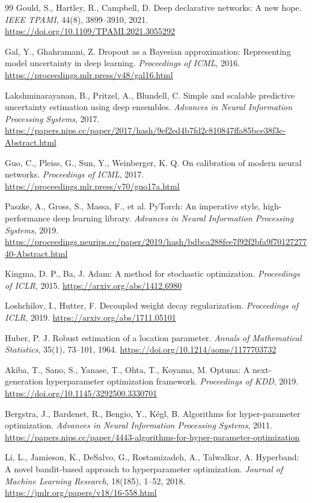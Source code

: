 \documentclass[11pt]{article}
\theoremstyle{definition}
\begin{document}
\begin{thebibliography}{99}
 Gould, S., Hartley, R., Campbell, D. Deep declarative networks: A new hope. \textit{IEEE TPAMI}, 44(8), 3899--3910, 2021. \url{https://doi.org/10.1109/TPAMI.2021.3055292}

 Gal, Y., Ghahramani, Z. Dropout as a Bayesian approximation: Representing model uncertainty in deep learning. \textit{Proceedings of ICML}, 2016. \url{https://proceedings.mlr.press/v48/gal16.html}

 Lakshminarayanan, B., Pritzel, A., Blundell, C. Simple and scalable predictive uncertainty estimation using deep ensembles. \textit{Advances in Neural Information Processing Systems}, 2017. \url{https://papers.nips.cc/paper/2017/hash/9ef2ed4b7fd2c810847ffa85bce38f3c-Abstract.html}

 Guo, C., Pleiss, G., Sun, Y., Weinberger, K. Q. On calibration of modern neural networks. \textit{Proceedings of ICML}, 2017. \url{https://proceedings.mlr.press/v70/guo17a.html}

 Paszke, A., Gross, S., Massa, F., et al. PyTorch: An imperative style, high-performance deep learning library. \textit{Advances in Neural Information Processing Systems}, 2019. \url{https://proceedings.neurips.cc/paper/2019/hash/bdbca288fee7f92f2bfa9f7012727740-Abstract.html}

 Kingma, D. P., Ba, J. Adam: A method for stochastic optimization. \textit{Proceedings of ICLR}, 2015. \url{https://arxiv.org/abs/1412.6980}

 Loshchilov, I., Hutter, F. Decoupled weight decay regularization. \textit{Proceedings of ICLR}, 2019. \url{https://arxiv.org/abs/1711.05101}

 Huber, P. J. Robust estimation of a location parameter. \textit{Annals of Mathematical Statistics}, 35(1), 73--101, 1964. \url{https://doi.org/10.1214/aoms/1177703732}

 Akiba, T., Sano, S., Yanase, T., Ohta, T., Koyama, M. Optuna: A next-generation hyperparameter optimization framework. \textit{Proceedings of KDD}, 2019. \url{https://doi.org/10.1145/3292500.3330701}

 Bergstra, J., Bardenet, R., Bengio, Y., Kégl, B. Algorithms for hyper-parameter optimization. \textit{Advances in Neural Information Processing Systems}, 2011. \url{https://papers.nips.cc/paper/4443-algorithms-for-hyper-parameter-optimization}

 Li, L., Jamieson, K., DeSalvo, G., Rostamizadeh, A., Talwalkar, A. Hyperband: A novel bandit-based approach to hyperparameter optimization. \textit{Journal of Machine Learning Research}, 18(185), 1--52, 2018. \url{https://jmlr.org/papers/v18/16-558.html}


\end{thebibliography}
\end{document}
